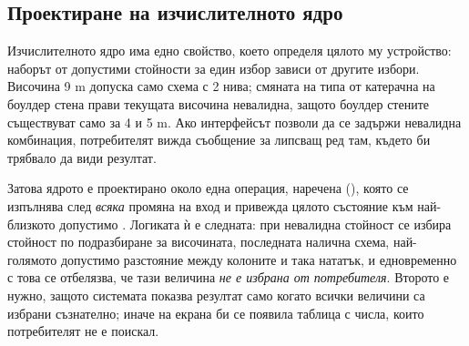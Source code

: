 \subsection{Проектиране на изчислителното ядро}
\label{subsec:core}

Изчислителното ядро има едно свойство, което определя цялото му устройство: наборът
от допустими стойности за един избор зависи от другите избори. Височина 9 m допуска
само схема с 2 нива; смяната на типа от катерачна на боулдер стена прави текущата
височина невалидна, защото боулдер стените съществуват само за 4 и 5 m. Ако
интерфейсът позволи да се задържи невалидна комбинация, потребителят вижда съобщение
за липсващ ред там, където би трябвало да види резултат.

Затова ядрото е проектирано около една операция, наречена 
(), която се изпълнява след \emph{всяка} промяна на вход и
привежда цялото състояние към най-близкото допустимо . Логиката ѝ
е следната: при невалидна стойност се избира стойност по подразбиране за височината,
последната налична схема, най-голямото допустимо разстояние между колоните и така
нататък, и едновременно с това се отбелязва, че тази величина \emph{не е избрана от
потребителя}. Второто е нужно, защото системата показва резултат само когато всички
величини са избрани съзнателно; иначе на екрана би се появила таблица с числа, които
потребителят не е поискал.

